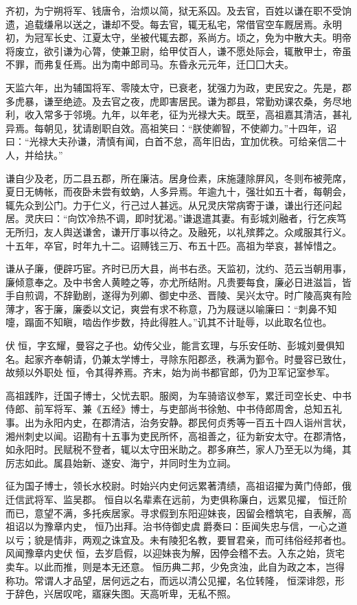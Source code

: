 \documentclass[12pt,UTF8]{ctexbook}
\begin{document}
齐初，为宁朔将军、钱唐令，治烦以简，狱无系囚。及去官，百姓以谦在职不受饷遗，追载缣帛以送之，谦却不受。每去官，辄无私宅，常借官空车厩居焉。永明初，为冠军长史、江夏太守，坐被代辄去郡，系尚方。顷之，免为中散大夫。明帝将废立，欲引谦为心膂，使兼卫尉，给甲仗百人，谦不愿处际会，辄散甲士，帝虽不罪，而弗复任焉。出为南中郎司马。东昏永元元年，迁囗囗大夫。

天监六年，出为辅国将军、零陵太守，已衰老，犹强力为政，吏民安之。先是，郡多虎暴，谦至绝迹。及去官之夜，虎即害居民。谦为郡县，常勤劝课农桑，务尽地利，收入常多于邻境。九年，以年老，征为光禄大夫。既至，高祖嘉其清洁，甚礼异焉。每朝见，犹请剧职自效。高祖笑曰：“朕使卿智，不使卿力。”十四年，诏曰：“光禄大夫孙谦，清慎有闻，白首不怠，高年旧齿，宜加优秩。可给亲信二十人，并给扶。”

谦自少及老，历二县五郡，所在廉洁。居身俭素，床施蘧除屏风，冬则布被莞席，夏日无帱帐，而夜卧未尝有蚊蚋，人多异焉。年逾九十，强壮如五十者，每朝会，辄先众到公门。力于仁义，行己过人甚远。从兄灵庆常病寄于谦，谦出行还问起居。灵庆曰：“向饮冷热不调，即时犹渴。”谦退遣其妻。有彭城刘融者，行乞疾笃无所归，友人舆送谦舍，谦开厅事以待之。及融死，以礼殡葬之。众咸服其行义。十五年，卒官，时年九十二。诏赙钱三万、布五十匹。高祖为举哀，甚悼惜之。

谦从子廉，便辟巧宦。齐时已历大县，尚书右丞。天监初，沈约、范云当朝用事，廉倾意奉之。及中书舍人黄睦之等，亦尤所结附。凡贵要每食，廉必日进滋旨，皆手自煎调，不辞勤剧，遂得为列卿、御史中丞、晋陵、吴兴太守。时广陵高爽有险薄才，客于廉，廉委以文记，爽尝有求不称意，乃为屐谜以喻廉曰：“刺鼻不知嚏，蹋面不知瞋，啮齿作步数，持此得胜人。”讥其不计耻辱，以此取名位也。

伏恒，字玄耀，曼容之子也。幼传父业，能言玄理，与乐安任昉、彭城刘曼俱知名。起家齐奉朝请，仍兼太学博士，寻除东阳郡丞，秩满为鄞令。时曼容已致仕，故频以外职处恒，令其得养焉。齐末，始为尚书都官郎，仍为卫军记室参军。

高祖践阼，迁国子博士，父忧去职。服阕，为车骑谘议参军，累迁司空长史、中书侍郎、前军将军、兼《五经》博士，与吏部尚书徐勉、中书侍郎周舍，总知五礼事。出为永阳内史，在郡清洁，治务安静。郡民何贞秀等一百五十四人诣州言状，湘州刺史以闻。诏勘有十五事为吏民所怀，高祖善之，征为新安太守。在郡清恪，如永阳时。民赋税不登者，辄以太守田米助之。郡多麻苎，家人乃至无以为绳，其厉志如此。属县始新、遂安、海宁，并同时生为立祠。

征为国子博士，领长水校尉。时始兴内史何远累著清绩，高祖诏擢为黄门侍郎，俄迁信武将军、监吴郡。恒自以名辈素在远前，为吏俱称廉白，远累见擢，恒迁阶而已，意望不满，多托疾居家。寻求假到东阳迎妹丧，因留会稽筑宅，自表解，高祖诏以为豫章内史，恒乃出拜。治书侍御史虞爵奏曰：臣闻失忠与信，一心之道以亏；貌是情非，两观之诛宜及。未有陵犯名教，要冒君亲，而可纬俗经邦者也。风闻豫章内史伏恒，去岁启假，以迎妹丧为解，因停会稽不去。入东之始，货宅卖车。以此而推，则是本无还意。恒历典二邦，少免贪浊，此自为政之本，岂得称功。常谓人才品望，居何远之右，而远以清公见擢，名位转隆，恒深诽怨，形于辞色，兴居叹咤，寤寐失图。天高听卑，无私不照。
\end{document}
